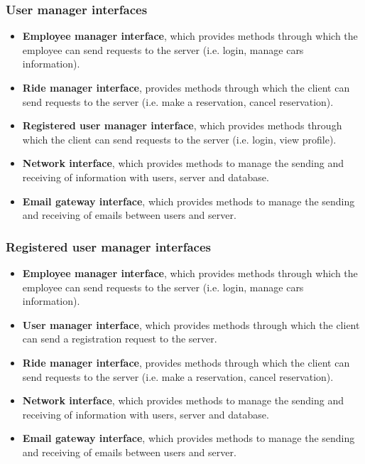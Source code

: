 \subsubsection{User manager interfaces}
\begin{itemize}
	\item \textbf{Employee manager interface}, which provides methods through which the employee can send requests to the server (i.e. login, manage cars information).
	\item \textbf{Ride manager interface}, provides methods through which the client can send requests to the server (i.e. make a reservation, cancel reservation).
	\item \textbf{Registered user manager interface}, which provides methods through which the client can send requests to the server (i.e. login, view profile).
	\item \textbf{Network interface}, which provides methods to manage the sending and receiving of information with users, server and database.
	\item \textbf{Email gateway interface}, which provides methods to manage the sending and receiving of emails between users and server.
\end{itemize}
\subsubsection{Registered user manager interfaces}
\begin{itemize}
	\item \textbf{Employee manager interface}, which provides methods through which the employee can send requests to the server (i.e. login, manage cars information).
	\item \textbf{User manager interface}, which provides methods through which the client can send a registration request to the server.
	\item \textbf{Ride manager interface}, provides methods through which the client can send requests to the server (i.e. make a reservation, cancel reservation).
	\item \textbf{Network interface}, which provides methods to manage the sending and receiving of information with users, server and database.
	\item \textbf{Email gateway interface}, which provides methods to manage the sending and receiving of emails between users and server.
\end{itemize}
